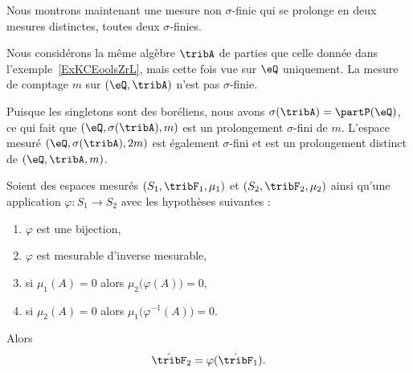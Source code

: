 
\begin{example}
    Nous montrons maintenant une mesure non \( \sigma\)-finie qui se prolonge en deux mesures distinctes, toutes deux \( \sigma\)-finies.

    Nous considérons la même algèbre \( \tribA\) de parties que celle donnée dans l'exemple~\ref{ExKCEoolsZrL}, mais cette fois vue sur \( \eQ\) uniquement. La mesure de comptage \( m\) sur \( (\eQ,\tribA)\) n'est pas \( \sigma\)-finie.

    Puisque les singletons sont des boréliens, nous avons \( \sigma(\tribA)=\partP(\eQ)\), ce qui fait que \( (\eQ,\sigma(\tribA),m)\) est un prolongement \( \sigma\)-fini de \( m\). L'espace mesuré \( (\eQ,\sigma(\tribA),2m)\) est également \( \sigma\)-fini et est un prolongement distinct de \( (\eQ,\tribA,m)\).
\end{example}

\begin{proposition}     \label{PROPooORDCooJEsjzR}
    Soient des espaces mesurés \( (S_1,\tribF_1,\mu_1)\) et \( (S_2,\tribF_2, \mu_2)\) ainsi qu'une application \( \varphi\colon S_1\to S_2\) avec les hypothèses suivantes :
    \begin{enumerate}
        \item
            \( \varphi\) est une bijection,
        \item
            \( \varphi\) est mesurable d'inverse mesurable,
        \item
            si \( \mu_1(A)=0\) alors \( \mu_2\big( \varphi(A) \big)=0\),
        \item
            si \( \mu_2(A)=0\) alors \( \mu_1\big( \varphi^{-1}(A) \big)=0\).
    \end{enumerate}
    Alors
    \begin{equation}
        \hat\tribF_2=\varphi(\hat\tribF_1).
    \end{equation}
\end{proposition}

